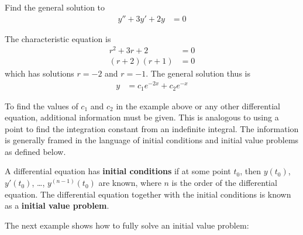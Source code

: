\begin{example}  \label{ex:solution:DE:image}
Find the general solution to 
%
\begin{align*}
y'' + 3y' + 2y & = 0 
\end{align*}

\solution

The characteristic equation is 
% 
\begin{align*}
r^2 + 3r+2 & = 0 \\
(r+2)(r+1) & = 0 
\end{align*}
which has solutions $r=-2$ and $r=-1$.  The general solution thus is
% 
\begin{align*}
y & = c_1 e^{-2x} + c_2 e^{-x}
\end{align*}

\end{example}

To find the values of $c_1$ and $c_2$ in the example above or any other differential equation, additional information must be given.  This is analogous to using a point to find the integration constant from an indefinite integral.  The information is generally framed in the language of initial conditions and initial value problems as defined below. 

\begin{definition}
A differential equation has \textbf{initial conditions} if at some point $t_0$, then $y(t_0)$, $y'(t_0)$, \ldots, $y^{(n-1)}(t_0)$ are known, where $n$ is the order of the differential equation.  The differential equation together with the initial conditions is known as a \textbf{initial value problem}.  
\end{definition}


The next example shows how to fully solve an initial value problem:

